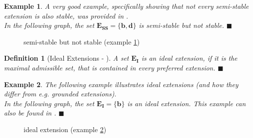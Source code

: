 \documentclass[12pt]{report}
\numberwithin{figure}{chapter}
\theoremstyle{break}
\newtheorem{defn}{Definition}[chapter]
\newtheorem{exmpl}{Example}[chapter]
\newenvironment{mydefn}{\begin{defn}}{$\blacksquare$ \end{defn}}
\newenvironment{myexmpl}{\begin{exmpl}}{$\blacksquare$ \end{exmpl}}
\begin{document}
\newpage

\begin{myexmpl}
A very good example, specifically showing that not every semi-stable extension is also stable, was provided in \cite{Caminada}.\\
In the following graph, the set $\bm{E_{SS}=\{b,d\}}$ is semi-stable but not stable.
\label{stable != semi-stable}
\end{myexmpl}
\begin{figure}[h!]
\begin{center}\end{center}
\caption{semi-stable but not stable (example \ref{stable != semi-stable})}
\end{figure}

\begin{mydefn}[Ideal Extensions - \cite{Dung2}]
A set $\bm{E_{I}}$ is an ideal extension, if it is the maximal admissible set, that is contained in every preferred extension.
\label{ideal ext}
\end{mydefn}

\begin{myexmpl}
The following example illustrates ideal extensions (and how they differ from e.g. grounded extensions).\\
In the following graph, the set $\bm{E_{I}=\{b\}}$ is an ideal extension. This example can also be found in \cite{Dung2}.
\label{ideal extension}
\end{myexmpl}
\begin{figure}[h!]
\begin{center}\end{center}
\caption{ideal extension (example \ref{ideal extension})}
\end{figure}
\end{document}
